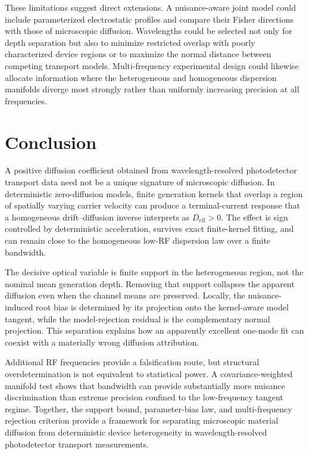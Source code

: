 \documentclass[aps,pra,twocolumn,superscriptaddress,nofootinbib]{revtex4-2}
\newcommand{\Deff}{D_{\mathrm{eff}}}
\begin{document}
These limitations suggest direct extensions. A nuisance-aware joint model could include parameterized electrostatic profiles and compare their Fisher directions with those of microscopic diffusion. Wavelengths could be selected not only for depth separation but also to minimize restricted overlap with poorly characterized device regions or to maximize the normal distance between competing transport models. Multi-frequency experimental design could likewise allocate information where the heterogeneous and homogeneous dispersion manifolds diverge most strongly rather than uniformly increasing precision at all frequencies.

\section{Conclusion}

A positive diffusion coefficient obtained from wavelength-resolved photodetector transport data need not be a unique signature of microscopic diffusion. In deterministic zero-diffusion models, finite generation kernels that overlap a region of spatially varying carrier velocity can produce a terminal-current response that a homogeneous drift--diffusion inverse interprets as $\Deff>0$. The effect is sign controlled by deterministic acceleration, survives exact finite-kernel fitting, and can remain close to the homogeneous low-RF dispersion law over a finite bandwidth.

The decisive optical variable is finite support in the heterogeneous region, not the nominal mean generation depth. Removing that support collapses the apparent diffusion even when the channel means are preserved. Locally, the nuisance-induced root bias is determined by its projection onto the kernel-aware model tangent, while the model-rejection residual is the complementary normal projection. This separation explains how an apparently excellent one-mode fit can coexist with a materially wrong diffusion attribution.

Additional RF frequencies provide a falsification route, but structural overdetermination is not equivalent to statistical power. A covariance-weighted manifold test shows that bandwidth can provide substantially more nuisance discrimination than extreme precision confined to the low-frequency tangent regime. Together, the support bound, parameter-bias law, and multi-frequency rejection criterion provide a framework for separating microscopic material diffusion from deterministic device heterogeneity in wavelength-resolved photodetector transport measurements.



\end{document}
